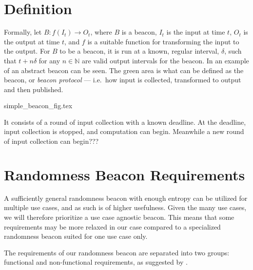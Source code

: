 \section{Definition}


Formally, let $B: f(I_t) \rightarrow O_t$, where $B$ is a beacon, $I_t$ is the input at time $t$, $O_t$ is the output at time $t$, and $f$ is a suitable function for transforming the input to the output.
For $B$ to be a beacon, it is run at a known, regular interval, $\delta$, such that $t+n\delta$ for any $n \in \mathbb{N}$ are valid output intervals for the beacon.
In  an example of an abstract beacon can be seen.
The green area is what can be defined as the beacon, or \emph{beacon protocol} --- i.e.\ how input is collected, transformed to output and then published.

{simple_beacon_fig.tex}


It consists of a round of input collection with a known deadline. At the deadline, input collection is stopped, and computation can begin. Meanwhile a new round of input collection can begin???

\section{Randomness Beacon Requirements}
\label{sec:beacon_requirements}

A sufficiently general randomness beacon with enough entropy can be utilized for multiple use cases, and as such is of higher usefulness. Given the many use cases, we will therefore prioritize a use case agnostic beacon.
This means that some requirements may be more relaxed in our case compared to a specialized randomness beacon suited for one use case only.%

The requirements of our randomness beacon are separated into two groups: functional and non-functional requirements, as suggested by \citet[sec.\ 1.4.1]{swebok}.

